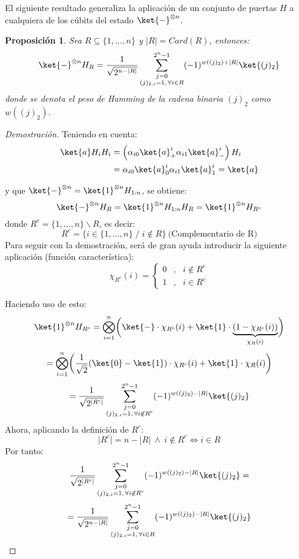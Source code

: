 \documentclass[10pt,conference,a4paper]{IEEEtran}
\newtheorem{prop}{Proposición}[section]
\providecommand{\abs}[1]{\lvert#1\rvert}
\begin{document}
\vspace{1mm}
El siguiente resultado  generaliza la aplicación de un conjunto de puertas $H$ a cualquiera de los cúbits del estado $\ket{-}^{\otimes n}$.
\vspace{1mm}
\begin{prop}
	Sea $R\subseteq \{1,\ldots,n\}$ y $\abs{R}=Card(R)$, entonces:
	\begin{equation}
		\ket{-}^{\otimes n}H_R=\dfrac{1}{\sqrt{2^{n-\abs{R}}}}\displaystyle\sum_{\substack{j=0\\(j)_{2,i}=1, \,\forall i\in R}}^{2^n-1}(-1)^{w((j)_2)+\abs{R}}\ket{(j)_2}
	\end{equation}
    \label{prop:9}
    donde se denota el peso de Hamming de la cadena binaria $(j)_2$ como $w((j)_2)$.
\end{prop}
\begin{proof}[Demostración] 
	Teniendo en cuenta:
    \begin{align*}
        \ket{a}H_i H_i&=\left(\alpha_{i0}\ket{a}_+^i\alpha_{i1}\ket{a}_-^i\right)H_i\\
        &=\alpha_{i0}\ket{a}_0^i\alpha_{i1}\ket{a}_1^i=\ket{a}
    \end{align*}
    
	y que $\ket{-}^{\otimes n}=\ket{1}^{\otimes n}H_{1:n}$, se obtiene:
	$$\ket{-}^{\otimes n}H_R=\ket{1}^{\otimes n}H_{1:n}H_R=\ket{1}^{\otimes n}H_{R^c}$$
	\noindent donde  $R^c=\{1,\ldots, n\}\backslash R$, es decir:\\
    $$R^c=\{i\in\{1,\ldots, n\} \; / \; i\not\in R\}\ \text{(Complementario de R)}$$
	Para seguir con la demostración, será de gran ayuda introducir la siguiente aplicación (función característica):
	$$\chi_{R^c}(i)= \left\{ \begin{array}{llc} 
		0 & , & i\not\in R^c \\ 
		1 & , & i\in R^c \end{array} \right.$$

	Haciendo uso de esto:
        $$\ket{1}^{\otimes n}H_{R^c}=\bigotimes_{i=1}^{n}\biggl(\ket{-}\cdot \chi_{R^c}(i)+\ket{1}\cdot \underbrace{\left(1-\chi_{R^c}(i)\right)}_{\chi_R(i)}\biggr)$$
        $$=\bigotimes_{i=1}^{n}\biggl(\dfrac{1}{\sqrt{2}}(\ket{0}-\ket{1})\cdot \chi_{R^c}(i)+\ket{1}\cdot \chi_R(i) \biggr)$$
        $$=\dfrac{1}{\sqrt{2^{\abs{R^c}}}}\displaystyle\sum_{\substack{j=0\\ (j)_{2,i}=1, \,\forall i\not\in R^c}}^{2^n-1}(-1)^{w((j)_2)-\abs{R}}\ket{(j)_2}$$
	Ahora, aplicando la definición de $R^c$: 
    $$\abs{R^c}=n-\abs{R}\ \land \ i\not\in R^c\Longleftrightarrow i\in R$$ 
    Por tanto:
	$$\dfrac{1}{\sqrt{2^{\abs{R^c}}}}\displaystyle\sum_{\substack{j=0\\ (j)_{2,i}=1, \,\forall i\not\in R^c}}^{2^n-1}(-1)^{w((j)_2)-\abs{R}}\ket{(j)_2}=$$
	$$=\dfrac{1}{\sqrt{2^{n-\abs{R}}}}\displaystyle\sum_{\substack{j=0\\ (j)_{2,i}=1, \,\forall i\in R}}^{2^n-1}(-1)^{w((j)_2)-\abs{R}}\ket{(j)_2}$$
\end{proof}
\end{document}
